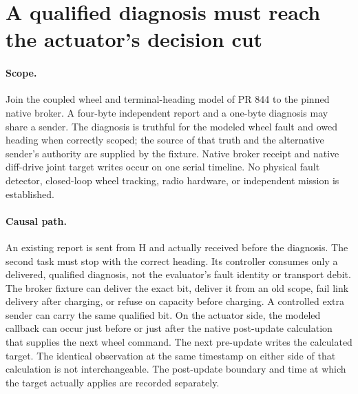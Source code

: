 \documentclass{article}
\begin{document}
\section*{A qualified diagnosis must reach the actuator's decision cut}
\paragraph{Scope.}
Join the coupled wheel and terminal-heading model of PR 844 to
the pinned native broker. A four-byte independent report and a
one-byte diagnosis may share a sender. The diagnosis is truthful
for the modeled wheel fault and owed heading when correctly scoped;
the source of that truth and the alternative sender's authority
are supplied by the fixture. Native broker receipt and native
diff-drive joint target writes occur on one serial timeline.
No physical fault detector, closed-loop wheel tracking,
radio hardware, or independent mission is established.

\paragraph{Causal path.}
An existing report is sent from H and actually received before the
diagnosis. The second task must stop with the correct heading.
Its controller consumes only a delivered, qualified diagnosis,
not the evaluator's fault identity or transport debit. The
broker fixture can deliver the exact bit, deliver it from an
old scope, fail link delivery after charging, or refuse on
capacity before charging. A controlled extra sender can carry
the same qualified bit. On the actuator side, the modeled
callback can occur just before or just after the native
post-update calculation that supplies the next wheel command.
The next pre-update writes the calculated target. The identical
observation at the same timestamp on either side of that
calculation is not interchangeable. The post-update boundary
and time at which the target actually applies are recorded separately.
\end{document}
